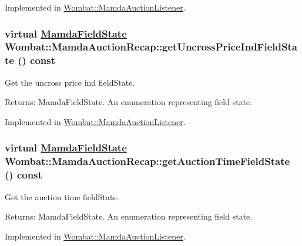 Implemented in \hyperlink{classWombat_1_1MamdaAuctionListener_8c84b078ac2c5e02cbb1dea5810cca7a}{Wombat::Mamda\-Auction\-Listener}.\hypertarget{classWombat_1_1MamdaAuctionRecap_b9fe8043eff51c5319bd348861da58cc}{
\subsubsection[getUncrossPriceIndFieldState]{\setlength{\rightskip}{0pt plus 5cm}virtual \hyperlink{namespaceWombat_93aac974f2ab713554fd12a1fa3b7d2a}{Mamda\-Field\-State} Wombat::Mamda\-Auction\-Recap::get\-Uncross\-Price\-Ind\-Field\-State () const}}
\label{classWombat_1_1MamdaAuctionRecap_b9fe8043eff51c5319bd348861da58cc}


Get the uncross price ind field\-State. 

\begin{Desc}
\item[Returns:]Mamda\-Field\-State. An enumeration representing field state. \end{Desc}


Implemented in \hyperlink{classWombat_1_1MamdaAuctionListener_99612e2b16ee7630f35ec21060109b11}{Wombat::Mamda\-Auction\-Listener}.\hypertarget{classWombat_1_1MamdaAuctionRecap_9acb736c81b7688a11c12295f6c16597}{
\subsubsection[getAuctionTimeFieldState]{\setlength{\rightskip}{0pt plus 5cm}virtual \hyperlink{namespaceWombat_93aac974f2ab713554fd12a1fa3b7d2a}{Mamda\-Field\-State} Wombat::Mamda\-Auction\-Recap::get\-Auction\-Time\-Field\-State () const}}
\label{classWombat_1_1MamdaAuctionRecap_9acb736c81b7688a11c12295f6c16597}


Get the auction time field\-State. 

\begin{Desc}
\item[Returns:]Mamda\-Field\-State. An enumeration representing field state. \end{Desc}


Implemented in \hyperlink{classWombat_1_1MamdaAuctionListener_62f24f47ce07200543881e47e8ff100f}{Wombat::Mamda\-Auction\-Listener}.